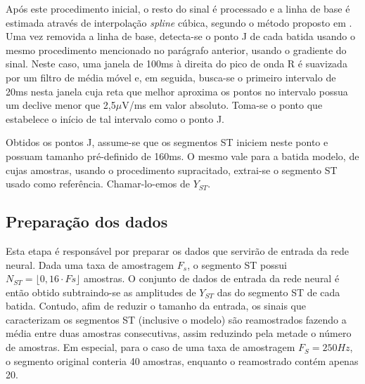 Após este procedimento inicial, o resto do sinal é processado e a linha de base é estimada através de interpolação \emph{spline} cúbica, segundo o método proposto em \cite{Badilini91}. Uma vez removida a linha de base, detecta-se o ponto J de cada batida usando o mesmo procedimento mencionado no parágrafo anterior, usando o gradiente do sinal. Neste caso, uma janela de 100ms à direita do pico de onda R é suavizada por um filtro de média móvel e, em seguida, busca-se o primeiro intervalo de 20ms nesta janela cuja reta que melhor aproxima os pontos no intervalo possua um declive menor que 2,5$\mu$V/ms em valor absoluto. Toma-se o ponto que estabelece o início de tal intervalo como o ponto J.

Obtidos os pontos J, assume-se que os segmentos ST iniciem neste ponto e possuam tamanho pré-definido de 160ms. O mesmo vale para a batida modelo, de cujas amostras, usando o procedimento supracitado, extrai-se o segmento ST usado como referência. Chamar-lo-emos de $Y_{ST}$.

\subsection{Preparação dos dados}
Esta etapa é responsável por preparar os dados que servirão de entrada da rede neural. Dada uma taxa de amostragem $F_s$, o segmento ST possui $N_{ST} = \lfloor0,16\cdot Fs\rfloor$ amostras. O conjunto de dados de entrada da rede neural é então obtido subtraindo-se as amplitudes de $Y_{ST}$ das do segmento ST de cada batida. Contudo, afim de reduzir o tamanho da entrada, os sinais que caracterizam os segmentos ST (inclusive o modelo) são reamostrados fazendo a média entre duas amostras consecutivas, assim reduzindo pela metade o número de amostras. Em especial, para o caso de uma taxa de amostragem $F_S = 250Hz$, o segmento original conteria 40 amostras, enquanto o reamostrado contém apenas 20.
